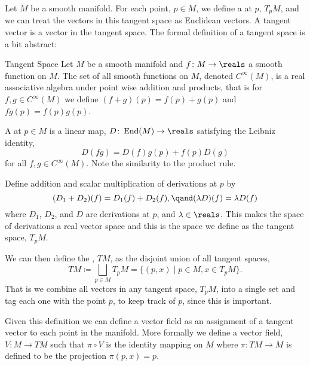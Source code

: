 \documentclass[fleqn]{NotesClass}
\DeclareMathOperator{\End}{End}
\begin{document}
    Let \(M\) be a smooth manifold.
    For each point, \(p \in M\), we define a  at \(p\), \(T_pM\), and we can treat the vectors in this tangent space as Euclidean vectors.
    A tangent vector is a vector in the tangent space.
    The formal definition of a tangent space is a bit abstract:
    \begin{dfn}{Tangent Space}{}
        Let \(M\) be a smooth manifold and \(f \colon M \to \reals\) a smooth function on \(M\).
        The set of all smooth functions on \(M\), denoted \(C^{\infty}(M)\), is a real associative algebra under point wise addition and products, that is for \(f, g \in C^{\infty}(M)\) we define \((f + g)(p) = f(p) + g(p)\) and \(fg(p) = f(p)g(p)\).
        
        A  at \(p \in M\) is a linear map, \(D \colon \End(M) \to \reals\) satisfying the Leibniz identity,
        \begin{equation}
            D(fg) = D(f)g(p) + f(p)D(g)
        \end{equation}
        for all \(f, g \in C^{\infty}(M)\).
        Note the similarity to the product rule.
        
        Define addition and scalar multiplication of derivations at \(p\) by
        \begin{equation}
            (D_1 + D_2)(f) = D_1(f) + D_2(f), \qand (\lambda D)(f) = \lambda D(f)
        \end{equation}
        where \(D_1\), \(D_2\), and \(D\) are derivations at \(p\), and \(\lambda \in \reals\).
        This makes the space of derivations a real vector space and this is the space we define as the tangent space, \(T_pM\).
        
        We can then define the , \(TM\), as the disjoint union of all tangent spaces,
        \begin{equation}
            TM \coloneqq \bigsqcup_{p \in M} T_pM = \{(p, x) \mid p \in M, x \in T_pM\}.
        \end{equation}
        That is we combine all vectors in any tangent space, \(T_pM\), into a single set and tag each one with the point \(p\), to keep track of \(p\), since this is important.
    \end{dfn}
    
    Given this definition we can define a vector field as an assignment of a tangent vector to each point in the manifold.
    More formally we define a vector field, \(V \colon M \to TM\) such that \(\pi \circ V\) is the identity mapping on \(M\) where \(\pi \colon TM \to M\) is defined to be the projection \(\pi(p, x) = p\).
    
\end{document}
